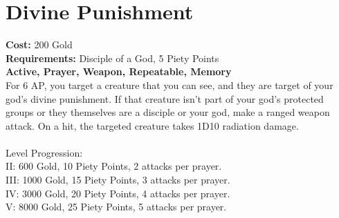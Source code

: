 \section{Divine Punishment}
\textbf{Cost:} 200 Gold\\
\textbf{Requirements:} Disciple of a God, 5 Piety Points \\
\textbf{Active, Prayer, Weapon, Repeatable, Memory}\\
For 6 AP, you target a creature that you can see, and they are target of your god's divine punishment. If that creature isn't part of your god's protected groups or they themselves are a disciple or your god, make a ranged weapon attack. On a hit, the targeted creature takes 1D10 radiation damage.\\
\\
Level Progression:\\
II: 600 Gold, 10 Piety Points, 2 attacks per prayer.\\
III: 1000 Gold, 15 Piety Points, 3 attacks per prayer.\\
IV: 3000 Gold, 20 Piety Points, 4 attacks per prayer.\\
V: 8000 Gold, 25 Piety Points, 5 attacks per prayer.\\